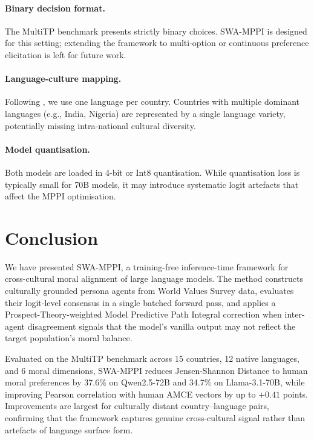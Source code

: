 \documentclass{article}
\begin{document}
\paragraph{Binary decision format.}
The MultiTP benchmark presents strictly binary choices. SWA-MPPI is designed for
this setting; extending the framework to multi-option or continuous preference
elicitation is left for future work.

\paragraph{Language-culture mapping.}
Following \citet{jin2025multitp}, we use one language per country. Countries with
multiple dominant languages (e.g., India, Nigeria) are represented by a single
language variety, potentially missing intra-national cultural diversity.

\paragraph{Model quantisation.}
Both models are loaded in 4-bit or Int8 quantisation. While quantisation loss is
typically small for 70B models, it may introduce systematic logit artefacts that
affect the MPPI optimisation.

\section{Conclusion}
\label{sec:conclusion}

We have presented SWA-MPPI, a training-free inference-time framework for
cross-cultural moral alignment of large language models. The method constructs
culturally grounded persona agents from World Values Survey data, evaluates their
logit-level consensus in a single batched forward pass, and applies a
Prospect-Theory-weighted Model Predictive Path Integral correction when
inter-agent disagreement signals that the model's vanilla output may not reflect
the target population's moral balance.

Evaluated on the MultiTP benchmark across 15 countries, 12 native languages, and
6 moral dimensions, SWA-MPPI reduces Jensen-Shannon Distance to human moral
preferences by 37.6\% on Qwen2.5-72B and 34.7\% on Llama-3.1-70B, while improving
Pearson correlation with human AMCE vectors by up to $+0.41$ points. Improvements
are largest for culturally distant country--language pairs, confirming that the
framework captures genuine cross-cultural signal rather than artefacts of language
surface form.
\end{document}
